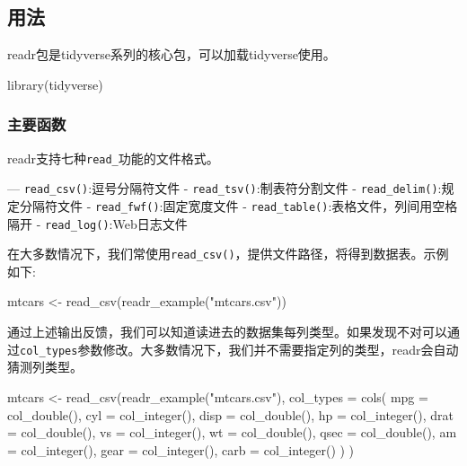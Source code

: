 \documentclass[
]{book}
\newenvironment{Shaded}{\begin{snugshade}}{\end{snugshade}}
\newcommand{\AttributeTok}[1]{\textcolor[rgb]{0.77,0.63,0.00}{#1}}
\newcommand{\FunctionTok}[1]{\textcolor[rgb]{0.00,0.00,0.00}{#1}}
\newcommand{\NormalTok}[1]{#1}
\newcommand{\OtherTok}[1]{\textcolor[rgb]{0.56,0.35,0.01}{#1}}
\newcommand{\StringTok}[1]{\textcolor[rgb]{0.31,0.60,0.02}{#1}}
\begin{document}
\hypertarget{readr:usage}{%
\subsection{用法}\label{readr:usage}}

readr包是tidyverse系列的核心包，可以加载tidyverse使用。

\begin{Shaded}
\begin{Highlighting}[]
\FunctionTok{library}\NormalTok{(tidyverse)}
\end{Highlighting}
\end{Shaded}

\hypertarget{ux4e3bux8981ux51fdux6570}{%
\subsubsection{主要函数}\label{ux4e3bux8981ux51fdux6570}}

readr支持七种\texttt{read\_}功能的文件格式。

--- \texttt{read\_csv()}:逗号分隔符文件
- \texttt{read\_tsv()}:制表符分割文件
- \texttt{read\_delim()}:规定分隔符文件
- \texttt{read\_fwf()}:固定宽度文件
- \texttt{read\_table()}:表格文件，列间用空格隔开
- \texttt{read\_log()}:Web日志文件

在大多数情况下，我们常使用\texttt{read\_csv()}，提供文件路径，将得到数据表。示例如下:

\begin{Shaded}
\begin{Highlighting}[]
\NormalTok{mtcars }\OtherTok{\textless{}{-}} \FunctionTok{read\_csv}\NormalTok{(}\FunctionTok{readr\_example}\NormalTok{(}\StringTok{"mtcars.csv"}\NormalTok{))}
\end{Highlighting}
\end{Shaded}

通过上述输出反馈，我们可以知道读进去的数据集每列类型。如果发现不对可以通过\texttt{col\_types}参数修改。大多数情况下，我们并不需要指定列的类型，readr会自动猜测列类型。

\begin{Shaded}
\begin{Highlighting}[]
\NormalTok{mtcars }\OtherTok{\textless{}{-}} \FunctionTok{read\_csv}\NormalTok{(}\FunctionTok{readr\_example}\NormalTok{(}\StringTok{"mtcars.csv"}\NormalTok{), }\AttributeTok{col\_types =} 
  \FunctionTok{cols}\NormalTok{(}
    \AttributeTok{mpg =} \FunctionTok{col\_double}\NormalTok{(),}
    \AttributeTok{cyl =} \FunctionTok{col\_integer}\NormalTok{(),}
    \AttributeTok{disp =} \FunctionTok{col\_double}\NormalTok{(),}
    \AttributeTok{hp =} \FunctionTok{col\_integer}\NormalTok{(),}
    \AttributeTok{drat =} \FunctionTok{col\_double}\NormalTok{(),}
    \AttributeTok{vs =} \FunctionTok{col\_integer}\NormalTok{(),}
    \AttributeTok{wt =} \FunctionTok{col\_double}\NormalTok{(),}
    \AttributeTok{qsec =} \FunctionTok{col\_double}\NormalTok{(),}
    \AttributeTok{am =} \FunctionTok{col\_integer}\NormalTok{(),}
    \AttributeTok{gear =} \FunctionTok{col\_integer}\NormalTok{(),}
    \AttributeTok{carb =} \FunctionTok{col\_integer}\NormalTok{()}
\NormalTok{  )}
\NormalTok{)}
\end{Highlighting}
\end{Shaded}
\end{document}
